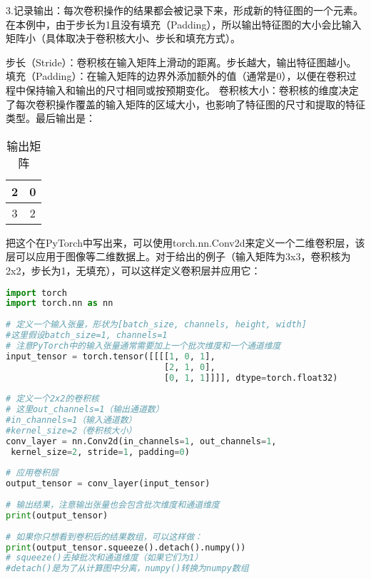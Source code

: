 3.记录输出：每次卷积操作的结果都会被记录下来，形成新的特征图的一个元素。在本例中，由于步长为1且没有填充（Padding），所以输出特征图的大小会比输入矩阵小（具体取决于卷积核大小、步长和填充方式）。

步长（Stride）：卷积核在输入矩阵上滑动的距离。步长越大，输出特征图越小。
填充（Padding）：在输入矩阵的边界外添加额外的值（通常是0），以便在卷积过程中保持输入和输出的尺寸相同或按预期变化。
卷积核大小：卷积核的维度决定了每次卷积操作覆盖的输入矩阵的区域大小，也影响了特征图的尺寸和提取的特征类型。
​
最后输出是：\begin{table}[ht]
\centering
\caption{输出矩阵}\label{tab_CNN24}
\begin{tabular}{|c|c|}
\hline
2 & 0 \\
\hline
3 & 2 \\
\hline
\end{tabular}
\end{table}

把这个在PyTorch中写出来，可以使用torch.nn.Conv2d来定义一个二维卷积层，该层可以应用于图像等二维数据上。对于给出的例子（输入矩阵为3x3，卷积核为2x2，步长为1，无填充），可以这样定义卷积层并应用它：


\begin{lstlisting}[language=python]
import torch  
import torch.nn as nn  
  
# 定义一个输入张量，形状为[batch_size, channels, height, width]
#这里假设batch_size=1, channels=1  
# 注意PyTorch中的输入张量通常需要加上一个批次维度和一个通道维度  
input_tensor = torch.tensor([[[[1, 0, 1],  
                               [2, 1, 0],  
                               [0, 1, 1]]]], dtype=torch.float32)  
  
# 定义一个2x2的卷积核
# 这里out_channels=1（输出通道数）
#in_channels=1（输入通道数）
#kernel_size=2（卷积核大小）  
conv_layer = nn.Conv2d(in_channels=1, out_channels=1,
 kernel_size=2, stride=1, padding=0)  
  
# 应用卷积层  
output_tensor = conv_layer(input_tensor)  
  
# 输出结果，注意输出张量也会包含批次维度和通道维度  
print(output_tensor)  
  
# 如果你只想看到卷积后的结果数组，可以这样做：  
print(output_tensor.squeeze().detach().numpy())  
# squeeze()去掉批次和通道维度（如果它们为1）
#detach()是为了从计算图中分离，numpy()转换为numpy数组
\end{lstlisting}
